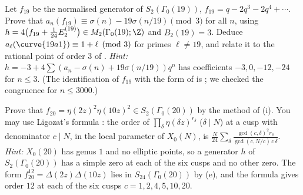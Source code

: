 \begin{exercise}\label{ex:modforms:ex-eis19}
Let $f_{19}$ be the normalised generator of $S_2(\Gamma_0(19))$, $f_{19}=q-2q^3-2q^4+\cdots$. Prove that $a_n(f_{19})\equiv\sigma(n)-19\sigma(n/19)\pmod3$ for all $n$, using
$h=4\bigl(f_{19}+\frac1{24}E_2^{(19)}\bigr)\in M_2(\Gamma_0(19);\Z)$ and $B_2(19)=3$. Deduce $a_\ell(\curve{19a1})\equiv1+\ell\pmod3$ for primes $\ell\ne19$, and relate it to the rational point of
order $3$ of .
\emph{Hint:} $h=-3+4\sum(a_n-\sigma(n)+19\sigma(n/19))q^n$ has coefficients $-3,0,-12,-24$ for $n\le3$. (The identification of $f_{19}$ with the form of  is ; we
checked the congruence for $n\le3000$.)
\end{exercise}

\begin{exercise}\label{ex:modforms:ex-eta20}
Prove that $f_{20}=\eta(2z)^2\eta(10z)^2\in S_2(\Gamma_0(20))$ by the method of (i). You may use Ligozat's formula \cite{Ligozat75}: the order of
$\prod_\delta\eta(\delta z)^{r_\delta}$ ($\delta\mid N$) at a cusp with denominator $c\mid N$, in the local parameter of $X_0(N)$, is $\frac N{24}\sum_\delta\frac{\gcd(c,\delta)^2r_\delta}{\gcd(c,N/c)\,c\,\delta}$.
\emph{Hint:} $X_0(20)$ has genus $1$ and no elliptic points, so a generator $h$ of $S_2(\Gamma_0(20))$ has a simple zero at each of the six cusps and no other zero. The form
$f_{20}^{12}=\Delta(2z)\Delta(10z)$ lies in $S_{24}(\Gamma_0(20))$ by (e), and the formula gives order $12$ at each of the six cusps $c=1,2,4,5,10,20$.
\end{exercise}

